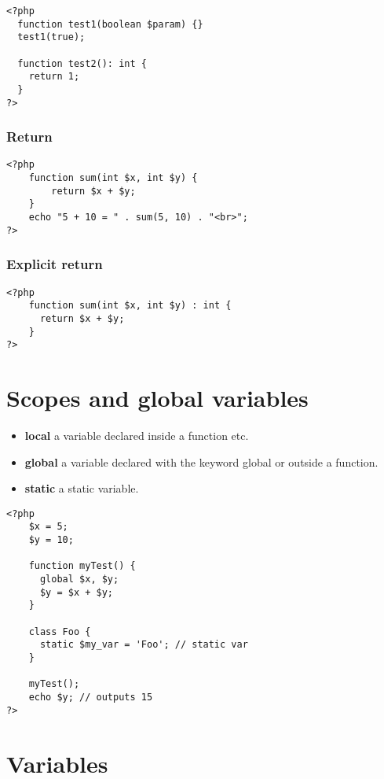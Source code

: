 \documentclass[a4paper]{article}
\begin{document}
\begin{lstlisting}
<?php
  function test1(boolean $param) {}
  test1(true);

  function test2(): int {
    return 1;
  }
?>
\end{lstlisting}

\pagebreak

\subsubsection{Return}

\begin{lstlisting}
<?php
    function sum(int $x, int $y) {
        return $x + $y;
    }
    echo "5 + 10 = " . sum(5, 10) . "<br>";
?>
\end{lstlisting}

\subsubsection{Explicit return}

\begin{lstlisting}
<?php
    function sum(int $x, int $y) : int {
      return $x + $y;
    }
?>
\end{lstlisting}

\section{Scopes and global variables}

\begin{itemize}
    \item \textbf{local} a variable declared inside a function etc.
    \item \textbf{global} a variable declared with the keyword global or outside a function.
    \item \textbf{static} a static variable.
\end{itemize}

\begin{lstlisting}
<?php
    $x = 5;
    $y = 10;
    
    function myTest() {
      global $x, $y;
      $y = $x + $y;
    }

    class Foo {
      static $my_var = 'Foo'; // static var
    }
    
    myTest();
    echo $y; // outputs 15
?>
\end{lstlisting}

\pagebreak

\section{Variables}
\end{document}
